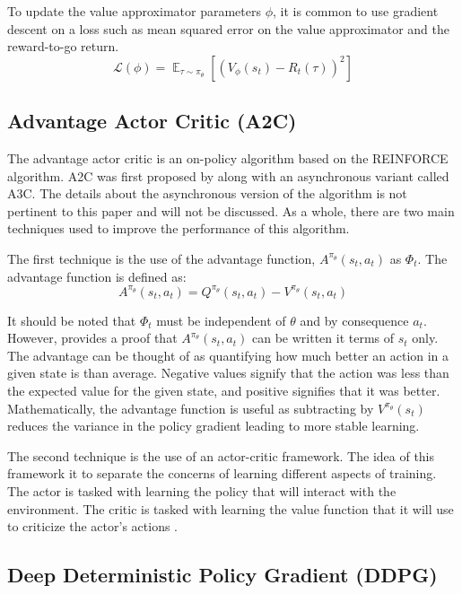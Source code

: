 \documentclass[conference]{IEEEtran}
\begin{document}
To update the value approximator parameters $\phi$, it is common to use gradient descent on a loss such as mean squared error on the value approximator and the reward-to-go return.
$$
    \mathcal{L}(\phi) = \mathop{\mathbb{E}}_{\tau \sim \pi_\theta} \left[\left(V_\phi(s_t) - R_t(\tau)\right)^2\right]
$$

\subsection{Advantage Actor Critic (A2C)}

The advantage actor critic is an on-policy algorithm based on the REINFORCE algorithm. A2C was first proposed by \cite{A2C} along with an asynchronous variant called A3C. The details about the asynchronous version of the algorithm is not pertinent to this paper and will not be discussed. As a whole, there are two main techniques used to improve the performance of this algorithm.

The first technique is the use of the advantage function, $A^{\pi_\theta}(s_t, a_t)$ as $\Phi_t$. The advantage function is defined as:
$$
    A^{\pi_\theta}(s_t, a_t) = Q^{\pi_\theta}(s_t, a_t) - V^{\pi_\theta}(s_t, a_t)
$$

It should be noted that $\Phi_t$ must be independent of $\theta$ and by consequence $a_t$. However, \cite{spinning_up_policy_optimization} provides a proof that $A^{\pi_\theta}(s_t, a_t)$ can be written it terms of $s_t$ only. The advantage can be thought of as quantifying how much better an action in a given state is than average. Negative values signify that the action was less than the expected value for the given state, and positive signifies that it was better. Mathematically, the advantage function is useful as subtracting by $V^{\pi_\theta}(s_t)$ reduces the variance in the policy gradient leading to more stable learning.

The second technique is the use of an actor-critic framework. The idea of this framework it to separate the concerns of learning different aspects of training. The actor is tasked with learning the policy that will interact with the environment. The critic is tasked with learning the value function that it will use to criticize the actor's actions \cite{deepmind_slides_9}.

\subsection{Deep Deterministic Policy Gradient (DDPG)}
\end{document}
